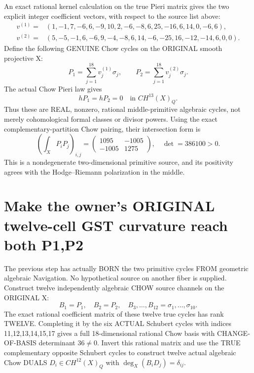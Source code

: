 \documentclass[11pt]{article}
\begin{document}
An exact rational kernel calculation on
the true Pieri matrix gives the two
explicit integer coefficient vectors,
with respect to the source list above:
\[
\begin{split}
v^{(1)}={}&(1,-1,7,-6,6,-9,10,2,-6,-8,6,
25,-16,6,14,0,-6,6),\\
v^{(2)}={}&(5,-5,-1,6,-6,9,-4,-8,6,14,-6,
-25,16,-12,-14,6,0,0).
\end{split}
\]
Define the following GENUINE Chow cycles on
the ORIGINAL smooth projective X:
\[
\boxed{
P_1=\sum_{j=1}^{18}v_j^{(1)}\sigma_j,\qquad
P_2=\sum_{j=1}^{18}v_j^{(2)}\sigma_j.
}\tag{2}
\]
The actual Chow Pieri law gives
\[
\boxed{hP_1=hP_2=0\quad\text{in }CH^{13}(X)_Q.}\tag{3}
\]
Thus these are REAL, nonzero, rational
middle-primitive algebraic cycles,
not merely cohomological formal
classes or divisor powers.
Using the exact complementary-partition
Chow pairing, their intersection form is
\[
\boxed{
\left(\int_X P_i P_j\right)_{i,j}
=\begin{pmatrix}1095&-1005\\-1005&1275\end{pmatrix},
\quad\det=386100>0.
}\tag{4}
\]
This is a nondegenerate two-dimensional
primitive source, and its positivity
agrees with the Hodge--Riemann
polarization in the middle.

\section{Make the owner's ORIGINAL twelve-cell GST curvature reach both P1,P2}
The previous step has actually BORN
the two primitive cycles FROM geometric
algebraic Navigation. No hypothetical
source on another fiber is supplied.
Construct twelve independently algebraic
CHOW source channels on the ORIGINAL X:
\[
B_1=P_1,\quad B_2=P_2,\quad
B_{3},\ldots,B_{12}=\sigma_1,\ldots,\sigma_{10}.
\]
The exact rational coefficient matrix of
these twelve true cycles has rank TWELVE.
Completing it by the six ACTUAL Schubert cycles
with indices 11,12,13,14,15,17 gives a full
18-dimensional rational Chow basis with
CHANGE-OF-BASIS determinant \(36\ne0\).
Invert this rational matrix and use the TRUE
complementary opposite Schubert cycles to
construct twelve actual algebraic Chow
DUALS \(D_i\in CH^{12}(X)_Q\) with
\(\deg_X(B_i D_j)=\delta_{ij}\).
\end{document}
